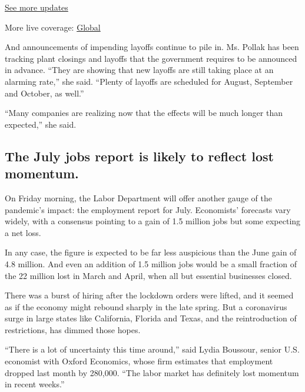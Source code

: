 \href{https://www.nytimes.com/live/2020/08/07/business/stock-market-today-coronavirus?action=click\&pgtype=Article\&state=default\&region=MAIN_CONTENT_1\&context=storylines_live_updates}{See
more updates}

More live coverage:
\href{https://www.nytimes.com/2020/08/07/world/covid-19-news.html?action=click\&pgtype=Article\&state=default\&region=MAIN_CONTENT_1\&context=storylines_live_updates}{Global}

And announcements of impending layoffs continue to pile in. Ms. Pollak
has been tracking plant closings and layoffs that the government
requires to be announced in advance. ``They are showing that new layoffs
are still taking place at an alarming rate,'' she said. ``Plenty of
layoffs are scheduled for August, September and October, as well.''

``Many companies are realizing now that the effects will be much longer
than expected,'' she said.

\hypertarget{the-july-jobs-report-is-likely-to-reflect-lost-momentum}{%
\subsection{The July jobs report is likely to reflect lost
momentum.}\label{the-july-jobs-report-is-likely-to-reflect-lost-momentum}}

On Friday morning, the Labor Department will offer another gauge of the
pandemic's impact: the employment report for July. Economists' forecasts
vary widely, with a consensus pointing to a gain of 1.5 million jobs but
some expecting a net loss.

In any case, the figure is expected to be far less auspicious than the
June gain of 4.8 million. And even an addition of 1.5 million jobs would
be a small fraction of the 22 million lost in March and April, when all
but essential businesses closed.

There was a burst of hiring after the lockdown orders were lifted, and
it seemed as if the economy might rebound sharply in the late spring.
But a coronavirus surge in large states like California, Florida and
Texas, and the reintroduction of restrictions, has dimmed those hopes.

``There is a lot of uncertainty this time around,'' said Lydia Boussour,
senior U.S. economist with Oxford Economics, whose firm estimates that
employment dropped last month by 280,000. ``The labor market has
definitely lost momentum in recent weeks.''

